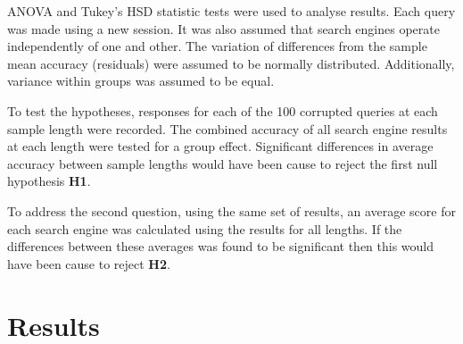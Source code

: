 \documentclass{csfourzero}
\begin{document}
ANOVA and Tukey's HSD statistic tests were used to analyse results. Each query was made using a new session. It was also assumed that search engines operate independently of one and other. The variation of differences from the sample mean accuracy (residuals) were assumed to be normally distributed. Additionally, variance within groups was assumed to be equal.

To test the hypotheses, responses for each of the 100 corrupted queries at each sample length were recorded. The combined accuracy of all search engine results at each length were tested for a group effect. Significant differences in average accuracy between sample lengths would have been cause to reject the first null hypothesis \textbf{H1}.

To address the second question, using the same set of results, an average score for each search engine was calculated using the results for all lengths. If the differences between these averages was found to be significant then this would have been cause to reject \textbf{H2}.

\section{Results}
\label{sec:results}
\end{document}
